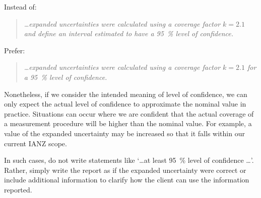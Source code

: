 Instead of:

\vspace{-\baselineskip}\begin{quote}\textit{
\ldots expanded uncertainties were calculated using a coverage factor $k =2.1$ and define an interval estimated to have a \SI{95}{\%} level of confidence.}
\end{quote} 
\vspace{-\baselineskip}Prefer:

\vspace{-\baselineskip}\begin{quote}\textit{
\ldots expanded uncertainties were calculated using a coverage factor $k = 2.1$ for a \SI{95}{\%} level of confidence.} 
\end{quote}

Nonetheless, if we consider the intended meaning of level of confidence, we can only expect the actual level of confidence to approximate the nominal value in practice. Situations can occur where we are confident that the actual coverage of a measurement procedure will be higher than the nominal value. For example, a value of the expanded uncertainty may be increased so that it falls within our current IANZ scope. 

In such cases, do not write statements like `\ldots at least \SI{95}{\%} level of confidence \ldots'. Rather, simply write the report as if the expanded uncertainty were correct or include additional information to clarify how the client can use the information reported.
